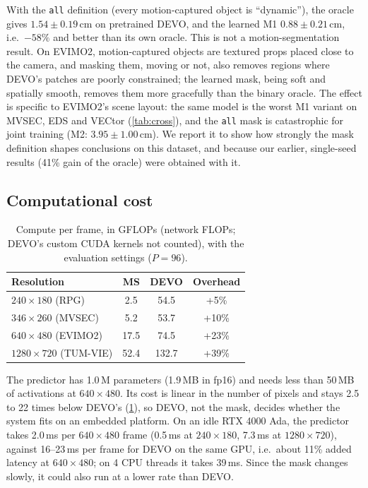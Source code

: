 \documentclass[conference]{IEEEtran}
\newcommand{\code}[1]{\texttt{#1}}
\begin{document}
With the \code{all} definition (every motion-captured object is ``dynamic''), the oracle
gives $1.54 \pm 0.19$\,cm on pretrained DEVO, and the learned M1 $0.88 \pm 0.21$\,cm,
i.e.\ $-58\%$ and better than its own oracle. This is not a motion-segmentation result. On
EVIMO2, motion-captured objects are textured props placed close to the camera, and masking
them, moving or not, also removes regions where DEVO's patches are poorly constrained; the
learned mask, being soft and spatially smooth, removes them more gracefully than the binary
oracle. The effect is specific to EVIMO2's scene layout: the same model is the worst M1
variant on MVSEC, EDS and VECtor (\cref{tab:cross}), and the \code{all} mask is
catastrophic for joint training (M2: $3.95 \pm 1.00$\,cm). We report it to show how
strongly the mask definition shapes conclusions on this dataset, and because our earlier,
single-seed results (41\% gain of the oracle) were obtained with it.

\subsection{Computational cost}

\begin{table}[t]
\centering
\caption{Compute per frame, in GFLOPs (network FLOPs; DEVO's custom CUDA kernels not
counted), with the evaluation settings ($P = 96$).}
\label{tab:cost}
\begin{tabular}{lccc}
\toprule
Resolution & MS & DEVO & Overhead \\
\midrule
$240\times180$ (RPG) & 2.5 & 54.5 & +5\% \\
$346\times260$ (MVSEC) & 5.2 & 53.7 & +10\% \\
$640\times480$ (EVIMO2) & 17.5 & 74.5 & +23\% \\
$1280\times720$ (TUM-VIE) & 52.4 & 132.7 & +39\% \\
\bottomrule
\end{tabular}
\end{table}

The predictor has 1.0\,M parameters (1.9\,MB in fp16) and needs less than 50\,MB of
activations at $640 \times 480$. Its cost is linear in the number of pixels and stays 2.5
to 22 times below DEVO's (\cref{tab:cost}), so DEVO, not the mask, decides whether the
system fits on an embedded platform. On an idle RTX 4000 Ada, the predictor takes 2.0\,ms
per $640 \times 480$ frame (0.5\,ms at $240 \times 180$, 7.3\,ms at $1280 \times 720$),
against 16--23\,ms per frame for DEVO on the same GPU, i.e.\ about 11\% added latency at
$640 \times 480$; on 4 CPU threads it takes 39\,ms. Since the mask changes slowly, it could
also run at a lower rate than DEVO.
\end{document}
